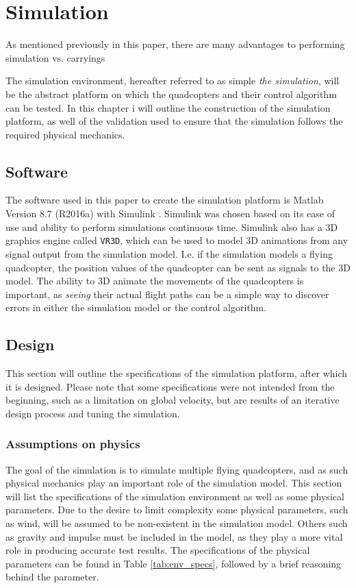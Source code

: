
\chapter{Simulation}
\label{chap:simulation}
As mentioned previously in this paper, there are many advantages to performing simulation vs. carryings 


The simulation environment, hereafter referred to as simple \textit{the simulation}, will be the abstract platform on which the quadcopters and their control algorithm can be tested. 
In this chapter i will outline the construction of the simulation platform, as well of the validation used to ensure that the simulation follows the required physical mechanics. 

\section{Software}
The software used in this paper to create the simulation platform is Matlab Version 8.7 (R2016a) with Simulink \cite{_matlab_2016}. Simulink was chosen based on its ease of use and ability to perform simulations continuous time. Simulink also has a 3D graphics engine called \texttt{VR3D}\cite{_matlab_2016}, which can be used to model 3D animations from any signal output from the simulation model. I.e. if the simulation models a flying quadcopter, the position values of the quadcopter can be sent as signals to the 3D model. The ability to 3D animate the movements of the quadcopters is important, as \textit{seeing} their actual flight paths can be a simple way to discover errors in either the simulation model or the control algorithm. 

\section{Design}
\label{sec:design}

This section will outline the specifications of the simulation platform, after which it is designed. Please note that some specifications were not intended from the beginning, such as a limitation on global velocity, but are results of an iterative design process and tuning the simulation. 

\subsection{Assumptions on physics}
\label{sec:physics}

The goal of the simulation is to simulate multiple flying quadcopters, and as such physical mechanics play an important role of the simulation model. This section will list the specifications of the simulation environment as well as some physical parameters. Due to the desire to limit complexity some physical parameters, such as wind, will be assumed to be non-existent in the simulation model. Others such as gravity and impulse must be included in the model, as they play a more vital role in producing accurate test results. The specifications of the physical parameters can be found in Table \ref{tab:env_specs}, followed by a brief reasoning behind the parameter.

